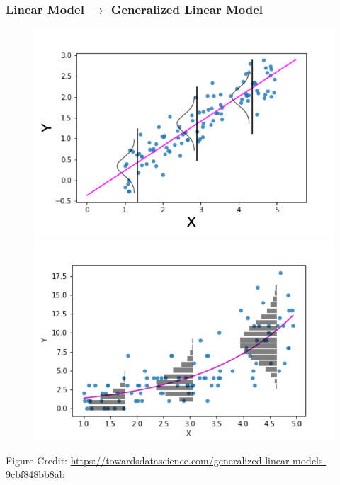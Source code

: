 \documentclass{beamer}
\begin{document}
\begin{frame}
\frametitle{Linear Model $\rightarrow$ Generalized Linear Model}

\begin{figure}
\includegraphics[scale=.3]{figures/linReg}\includegraphics[scale=.3]{figures/poisReg}
\end{figure}


Figure Credit: \url{https://towardsdatascience.com/generalized-linear-models-9cbf848bb8ab}


\end{frame}
\end{document}
